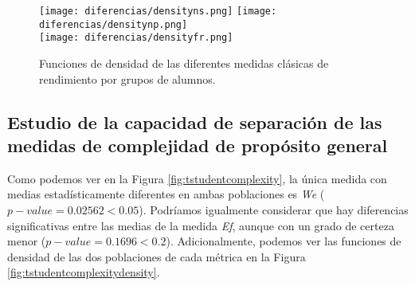 \begin{figure}[H]
\centering
\texttt{[image: diferencias/densityns.png]}
\texttt{[image: diferencias/densitynp.png]} \\
\texttt{[image: diferencias/densityfr.png]}
\caption{Funciones de densidad de las diferentes medidas clásicas de rendimiento por grupos de alumnos.}
\label{fig:tstudentcomplexitydensityclassic}
\end{figure}

\subsection{Estudio de la capacidad de separación de las medidas de complejidad de propósito general}

Como podemos ver en la Figura \ref{fig:tstudentcomplexity}, la única medida con medias estadísticamente diferentes en ambas poblaciones es \emph{We} ($p-value = 0.02562 < 0.05$). Podríamos igualmente considerar que hay diferencias significativas entre las medias de la medida \emph{Ef}, aunque con un grado de certeza menor ($p-value = 0.1696 < 0.2$). Adicionalmente, podemos ver las funciones de densidad de las dos poblaciones de cada métrica en la Figura \ref{fig:tstudentcomplexitydensity}.

